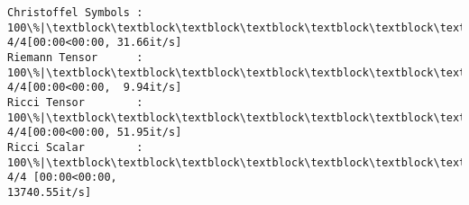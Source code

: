 \documentclass[11pt]{article}
\newcommand{\prompt}[4]{
        {\ttfamily\llap{{\color{#2}[#3]:\hspace{3pt}#4}}\vspace{-\baselineskip}}
    }
\begin{document}
    \begin{Verbatim}[commandchars=\\\{\}]
Christoffel Symbols : 100\%|\textblock\textblock\textblock\textblock\textblock\textblock\textblock\textblock\textblock\textblock\textblock\textblock\textblock\textblock\textblock\textblock\textblock\textblock\textblock\textblock\textblock\textblock\textblock\textblock\textblock\textblock\textblock\textblock\textblock\textblock\textblock\textblock\textblock\textblock\textblock| 4/4[00:00<00:00, 31.66it/s]
Riemann Tensor      : 100\%|\textblock\textblock\textblock\textblock\textblock\textblock\textblock\textblock\textblock\textblock\textblock\textblock\textblock\textblock\textblock\textblock\textblock\textblock\textblock\textblock\textblock\textblock\textblock\textblock\textblock\textblock\textblock\textblock\textblock\textblock\textblock\textblock\textblock\textblock\textblock| 4/4[00:00<00:00,  9.94it/s]
Ricci Tensor        : 100\%|\textblock\textblock\textblock\textblock\textblock\textblock\textblock\textblock\textblock\textblock\textblock\textblock\textblock\textblock\textblock\textblock\textblock\textblock\textblock\textblock\textblock\textblock\textblock\textblock\textblock\textblock\textblock\textblock\textblock\textblock\textblock\textblock\textblock\textblock\textblock| 4/4[00:00<00:00, 51.95it/s]
Ricci Scalar        : 100\%|\textblock\textblock\textblock\textblock\textblock\textblock\textblock\textblock\textblock\textblock\textblock\textblock\textblock\textblock\textblock\textblock\textblock\textblock\textblock\textblock\textblock\textblock\textblock\textblock\textblock\textblock\textblock\textblock\textblock\textblock\textblock\textblock| 4/4 [00:00<00:00,
13740.55it/s]
    \end{Verbatim}
 
            
\prompt{Out}{outcolor}{14}{}
    
\end{document}
